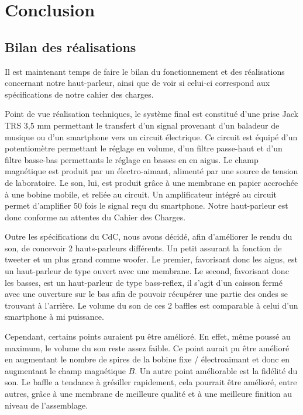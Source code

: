\chapter{Conclusion}

\section{Bilan des réalisations}

Il est maintenant temps de faire le bilan du fonctionnement et des réalisations concernant notre haut-parleur, ainsi que de voir si celui-ci correspond aux spécifications de notre cahier des charges.

Point de vue réalisation techniques, le système final est constitué d'une prise Jack TRS 3,5 mm permettant le transfert d'un signal provenant d'un baladeur de musique ou d'un smartphone vers un circuit électrique. Ce circuit est équipé d'un potentiomètre permettant le réglage en volume, d'un filtre passe-haut et d'un filtre basse-bas permettants le réglage en basses en en aigus. Le champ magnétique est produit par un électro-aimant, alimenté par une source de tension de laboratoire. Le son, lui, est produit grâce à une membrane en papier accrochée à une bobine mobile, et reliée au circuit. Un amplificateur intégré au circuit permet d'amplifier 50 fois le signal reçu du smartphone. Notre haut-parleur est donc conforme au attentes du Cahier des Charges.

Outre les spécifications du CdC, nous avons décidé, afin d'améliorer le rendu du son, de concevoir 2 hauts-parleurs différents. Un petit assurant la fonction de tweeter et un plus grand comme woofer. Le premier, favorisant donc les aigus, est un haut-parleur de  type ouvert avec une membrane. Le second, favorisant donc les basses, est un haut-parleur de type bass-reflex, il s'agit d'un caisson fermé avec une ouverture sur le bas afin de pouvoir récupérer une partie des ondes se trouvant à l'arrière. Le volume du son de ces 2 baffles est comparable à celui d'un smartphone à mi puissance.

Cependant, certains points auraient pu être amélioré. En effet, même poussé au maximum, le volume du son reste assez faible.  Ce point aurait pu être amélioré en augmentant le nombre de spires de la bobine fixe / électroaimant et donc en augmentant le champ magnétique $B$.
Un autre point améliorable est la fidélité du son. Le baffle a tendance à grésiller rapidement, cela pourrait être amélioré, entre autres, grâce à une membrane de meilleure qualité et à une meilleure finition au niveau de l'assemblage.

